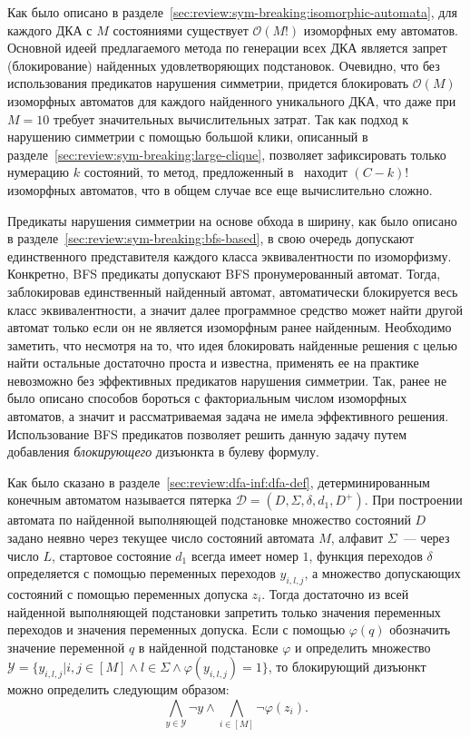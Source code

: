 Как было описано в разделе~\ref{sec:review:sym-breaking:isomorphic-automata}, для каждого ДКА с $M$ состояниями существует $\mathcal{O}\left(M!\right)$ изоморфных ему автоматов.
Основной идеей предлагаемого метода по генерации всех ДКА является запрет (блокирование) найденных удовлетворяющих подстановок.
Очевидно, что без использования предикатов нарушения симметрии, придется блокировать $\mathcal{O}\left(M\right)$ изоморфных автоматов для каждого найденного уникального ДКА, что даже при $M = 10$ требует значительных вычислительных затрат.
Так как подход к нарушению симметрии с помощью большой клики, описанный в разделе~\ref{sec:review:sym-breaking:large-clique}, позволяет зафиксировать только нумерацию $k$ состояний, то метод, предложенный в~\cite{heule-icgi10} находит $\left(C - k\right)!$ изоморфных автоматов, что в общем случае все еще вычислительно сложно.

Предикаты нарушения симметрии на основе обхода в ширину, как было описано в разделе~\ref{sec:review:sym-breaking:bfs-based}, в свою очередь допускают единственного представителя каждого класса эквивалентности по изоморфизму.
Конкретно, BFS предикаты допускают BFS пронумерованный автомат.
Тогда, заблокировав единственный найденный автомат, автоматически блокируется весь класс эквивалентности, а значит далее программное средство может найти другой автомат только если он не является изоморфным ранее найденным.
Необходимо заметить, что несмотря на то, что идея блокировать найденные решения с целью найти остальные достаточно проста и известна, применять ее на практике невозможно без эффективных предикатов нарушения симметрии.
Так, ранее не было описано способов бороться с факториальным числом изоморфных автоматов, а значит и рассматриваемая задача не имела эффективного решения.
Использование BFS предикатов позволяет решить данную задачу путем добавления \emph{блокирующего} дизъюнкта в булеву формулу. 

Как было сказано в разделе~\ref{sec:review:dfa-inf:dfa-def}, детерминированным конечным автоматом называется пятерка $\mathcal{D} = \left(D,\Sigma,\delta,d_{1},D^{+}\right)$.
При построении автомата по найденной выполняющей подстановке множество состояний $D$ задано неявно через текущее число состояний автомата $M$, алфавит $\Sigma$~{---} через число $L$, стартовое состояние $d_{1}$ всегда имеет номер $1$, функция переходов $\delta$ определяется с помощью переменных переходов $y_{i,l,j}$, а множество допускающих состояний с помощью переменных допуска $z_{i}$.
Тогда достаточно из всей найденной выполняющей подстановки запретить только значения переменных переходов и значения переменных допуска.
Если с помощью $\varphi\left(q\right)$ обозначить значение переменной $q$ в найденной подстановке $\varphi$ и определить множество $\mathcal{Y} = \{y_{i,l,j} | i,j \in \left[M\right] \wedge l \in \Sigma \wedge \varphi\left(y_{i,l,j}\right) = 1\}$, то блокирующий дизъюнкт можно определить следующим образом:
\begin{equation*}
\bigwedge_{y \in \mathcal{Y}} \neg y \wedge \bigwedge_{i \in \left[M\right]}\neg \varphi\left(z_{i}\right).
\end{equation*}


